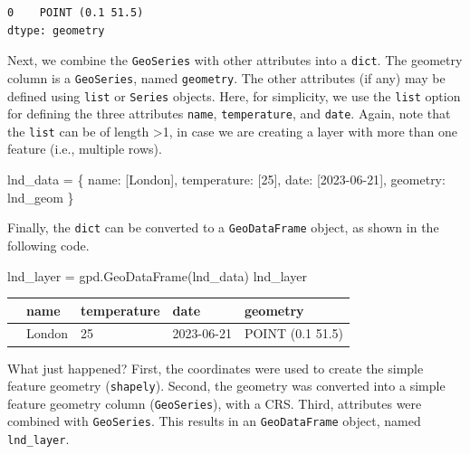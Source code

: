 \documentclass[
  letterpaper,
]{krantz}
\newenvironment{Shaded}{\begin{snugshade}}{\end{snugshade}}
\newcommand{\DecValTok}[1]{\textcolor[rgb]{0.68,0.00,0.00}{#1}}
\newcommand{\NormalTok}[1]{\textcolor[rgb]{0.00,0.23,0.31}{#1}}
\newcommand{\OperatorTok}[1]{\textcolor[rgb]{0.37,0.37,0.37}{#1}}
\newcommand{\StringTok}[1]{\textcolor[rgb]{0.13,0.47,0.30}{#1}}
\begin{document}
\begin{verbatim}
0    POINT (0.1 51.5)
dtype: geometry
\end{verbatim}

Next, we combine the \texttt{GeoSeries} with other attributes into a
\texttt{dict}. The geometry column is a \texttt{GeoSeries}, named
\texttt{geometry}. The other attributes (if any) may be defined using
\texttt{list} or \texttt{Series} objects. Here, for simplicity, we use
the \texttt{list} option for defining the three attributes
\texttt{name}, \texttt{temperature}, and \texttt{date}. Again, note that
the \texttt{list} can be of length \textgreater1, in case we are
creating a layer with more than one feature (i.e., multiple rows).

\begin{Shaded}
\begin{Highlighting}[]
\NormalTok{lnd\_data }\OperatorTok{=}\NormalTok{ \{}
  \StringTok{\textquotesingle{}name\textquotesingle{}}\NormalTok{: [}\StringTok{\textquotesingle{}London\textquotesingle{}}\NormalTok{],}
  \StringTok{\textquotesingle{}temperature\textquotesingle{}}\NormalTok{: [}\DecValTok{25}\NormalTok{],}
  \StringTok{\textquotesingle{}date\textquotesingle{}}\NormalTok{: [}\StringTok{\textquotesingle{}2023{-}06{-}21\textquotesingle{}}\NormalTok{],}
  \StringTok{\textquotesingle{}geometry\textquotesingle{}}\NormalTok{: lnd\_geom}
\NormalTok{\}}
\end{Highlighting}
\end{Shaded}

Finally, the \texttt{dict} can be converted to a \texttt{GeoDataFrame}
object, as shown in the following code.

\begin{Shaded}
\begin{Highlighting}[]
\NormalTok{lnd\_layer }\OperatorTok{=}\NormalTok{ gpd.GeoDataFrame(lnd\_data)}
\NormalTok{lnd\_layer}
\end{Highlighting}
\end{Shaded}

\begin{longtable}[]{@{}lllll@{}}
\toprule\noalign{}
& name & temperature & date & geometry \\
\midrule\noalign{}
\endhead
\bottomrule\noalign{}
\endlastfoot
0 & London & 25 & 2023-06-21 & POINT (0.1 51.5) \\
\end{longtable}

What just happened? First, the coordinates were used to create the
simple feature geometry (\texttt{shapely}). Second, the geometry was
converted into a simple feature geometry column (\texttt{GeoSeries}),
with a CRS. Third, attributes were combined with \texttt{GeoSeries}.
This results in an \texttt{GeoDataFrame} object, named
\texttt{lnd\_layer}.
\end{document}
